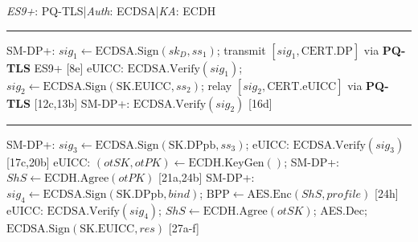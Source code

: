 \documentclass[a4paper,fleqn]{cas-sc}
\begin{document}
\begin{algorithm}[H]
\caption{Config (b): PQ-TLS transport only: ECDSA + ECDH + \textcolor{cfgB}{PQ-TLS}}
\label{alg:flow-b}
\footnotesize
\begin{algorithmic}[1]
\Statex \textcolor{cfgB}{\textit{ES9+}: PQ-TLS}\enspace|\enspace\textit{Auth}: ECDSA\enspace|\enspace\textit{KA}: ECDH
\Statex \rule{0.95\linewidth}{0.2pt}
\State SM-DP+: $\mathit{sig}_1\gets\text{ECDSA.Sign}(\mathit{sk}_D,\mathit{ss}_1)$; transmit $[\mathit{sig}_1,\mathrm{CERT.DP}]$ via \textcolor{cfgB}{\textbf{PQ-TLS}} ES9+ {\color{gray}[8e]}
\State eUICC: $\text{ECDSA.Verify}(\mathit{sig}_1)$; $\mathit{sig}_2\gets\text{ECDSA.Sign}(\mathrm{SK.EUICC},\mathit{ss}_2)$; relay $[\mathit{sig}_2,\mathrm{CERT.eUICC}]$ via \textcolor{cfgB}{\textbf{PQ-TLS}} {\color{gray}[12c,13b]}
\State SM-DP+: $\text{ECDSA.Verify}(\mathit{sig}_2)$ {\color{gray}[16d]}
\Statex \rule{0.95\linewidth}{0.2pt}
\State SM-DP+: $\mathit{sig}_3\gets\text{ECDSA.Sign}(\mathrm{SK.DPpb},\mathit{ss}_3)$; eUICC: $\text{ECDSA.Verify}(\mathit{sig}_3)$ {\color{gray}[17c,20b]}
\State eUICC: $(\mathit{otSK},\mathit{otPK})\gets\text{ECDH.KeyGen}()$; SM-DP+: $\mathit{ShS}\gets\text{ECDH.Agree}(\mathit{otPK})$ {\color{gray}[21a,24b]}
\State SM-DP+: $\mathit{sig}_4\gets\text{ECDSA.Sign}(\mathrm{SK.DPpb},\mathit{bind})$; $\mathrm{BPP}\gets\text{AES.Enc}(\mathit{ShS},\mathit{profile})$ {\color{gray}[24h]}
\State eUICC: $\text{ECDSA.Verify}(\mathit{sig}_4)$; $\mathit{ShS}\gets\text{ECDH.Agree}(\mathit{otSK})$; AES.Dec; $\text{ECDSA.Sign}(\mathrm{SK.EUICC},\mathit{res})$ {\color{gray}[27a-f]}
\end{algorithmic}
\end{algorithm}
\end{document}
